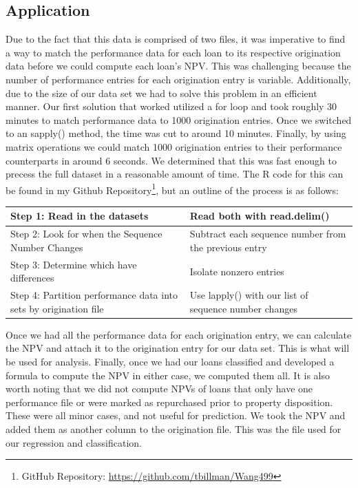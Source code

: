 \documentclass[12 pt]{uncw_thesis}
\theoremstyle{plain}
\theoremstyle{remark}
\theoremstyle{definition}
\begin{document}
\subsection{Application}
Due to the fact that this data is comprised of two files, it was imperative to find a way to match the performance data for each loan to its respective origination data before we could compute each loan's NPV. This was challenging because the number of performance entries for each origination entry is variable. Additionally, due to the size of our data set we had to solve this problem in an efficient manner. Our first solution that worked utilized a for loop and took roughly 30 minutes to match performance data to 1000 origination entries. Once we switched to an sapply() method, the time was cut to around 10 minutes. Finally, by using matrix operations we could match 1000 origination entries to their performance counterparts in around 6 seconds. We determined that this was fast enough to precess the full dataset in a reasonable amount of time. The R code for this can be found in my Github Repository\footnote{GitHub Repository: \href{https://github.com/tbillman/Wang499}{https://github.com/tbillman/Wang499}}, but an outline of the process is as follows:
\begin{center}
	\begin{tabular}{|M{6cm}|M{8cm}|} 
		\hline
		Step 1: Read in the datasets & Read both with read.delim()\\ 
		\hline
		Step 2: Look for when the Sequence Number Changes& Subtract each sequence number from the previous entry\\
		\hline
		Step 3: Determine which have differences & Isolate nonzero entries \\
		\hline
		Step 4: Partition performance data into sets by origination file & Use lapply() with our list of sequence number changes\\
		\hline
	\end{tabular}
\end{center}
Once we had all the performance data for each origination entry, we can calculate the NPV and attach it to the origination entry for our data set. This is what will be used for analysis.
Finally, once we had our loans classified and developed a formula to compute the NPV in either case, we computed them all. It is also worth noting that we did not compute NPVs of loans that only have one performance file or were marked as repurchased prior to property disposition. These were all minor cases, and not useful for prediction. We took the NPV and added them as another column to the origination file. This was the file used for our regression and classification. 
\end{document}
